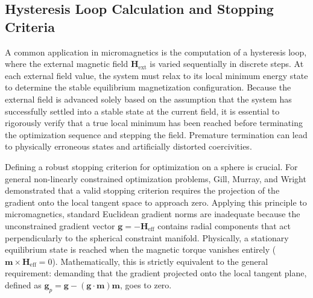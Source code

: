 \documentclass[10pt, a4paper, twocolumn]{article}
\begin{document}
\subsection{Hysteresis Loop Calculation and Stopping Criteria}

A common application in micromagnetics is the computation of a hysteresis loop, where the external magnetic field $\mathbf{H}_{\mathrm{ext}}$ is varied sequentially in discrete steps. At each external field value, the system must relax to its local minimum energy state to determine the stable equilibrium magnetization configuration. Because the external field is advanced solely based on the assumption that the system has successfully settled into a stable state at the current field, it is essential to rigorously verify that a true local minimum has been reached before terminating the optimization sequence and stepping the field. Premature termination can lead to physically erroneous states and artificially distorted coercivities.

Defining a robust stopping criterion for optimization on a sphere is crucial. For general non-linearly constrained optimization problems, Gill, Murray, and Wright \cite{GillMurray1981} demonstrated that a valid stopping criterion requires the projection of the gradient onto the local tangent space to approach zero. Applying this principle to micromagnetics, standard Euclidean gradient norms are inadequate because the unconstrained gradient vector $\mathbf{g} = -\mathbf{H}_{\mathrm{eff}}$ contains radial components that act perpendicularly to the spherical constraint manifold. Physically, a stationary equilibrium state is reached when the magnetic torque vanishes entirely ($\mathbf{m} \times \mathbf{H}_{\mathrm{eff}} = 0$). Mathematically, this is strictly equivalent to the general requirement: demanding that the gradient projected onto the local tangent plane, defined as $\mathbf{g}_p = \mathbf{g} - (\mathbf{g} \cdot \mathbf{m})\mathbf{m}$, goes to zero.
\end{document}

